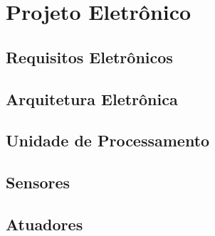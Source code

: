 
\chapter{Projeto Eletrônico}
\label{chap:projeto-eletronico}


\section{Requisitos Eletrônicos}
\label{sec:requisitos-eletronicos}


\section{Arquitetura Eletrônica}
\label{sec:arquitetura-eletronica}


\section{Unidade de Processamento}
\label{sec:unidade-processamento}


\section{Sensores}
\label{sec:sensores}


\section{Atuadores}
\label{sec:atuadores}


